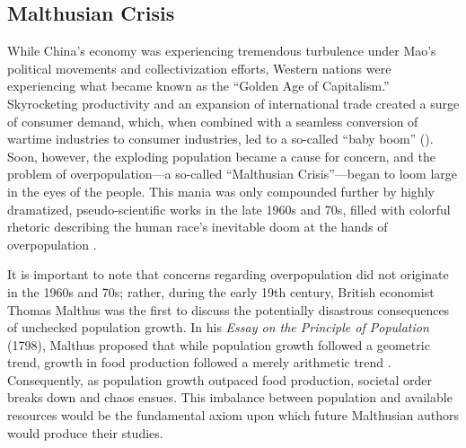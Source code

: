 \documentclass[12pt, a4paper, twoside]{article}
\begin{document}
\subsection{Malthusian Crisis}

While China’s economy was experiencing tremendous turbulence under Mao’s political movements and collectivization efforts, Western nations were experiencing what became known as the “Golden Age of Capitalism.” Skyrocketing productivity and an expansion of international trade created a surge of consumer demand, which, when combined with a seamless conversion of wartime industries to consumer industries, led to a so-called “baby boom” (\cites{UN2017PostWarReconstruction}{Moffatt2020ThoughtCo}{Easterlin1987}). Soon, however, the exploding population became a cause for concern, and the problem of overpopulation---a so-called “Malthusian Crisis”---began to loom large in the eyes of the people. This mania was only compounded further by highly dramatized, pseudo-scientific works in the late 1960s and 70s, filled with colorful rhetoric describing the human race’s inevitable doom at the hands of overpopulation \autocite[p.\ 73]{DesrochersHoffbauer2009}.

It is important to note that concerns regarding overpopulation did not originate in the 1960s and 70s; rather, during the early 19th century, British economist Thomas Malthus was the first to discuss the potentially disastrous consequences of unchecked population growth. In his \emph{Essay on the Principle of Population} (1798), Malthus proposed that while population growth followed a geometric trend, growth in food production followed a merely arithmetic trend \autocite{Malthus1999}. Consequently, as population growth outpaced food production, societal order breaks down and chaos ensues. This imbalance between population and available resources would be the fundamental axiom upon which future Malthusian authors would produce their studies.
\end{document}
